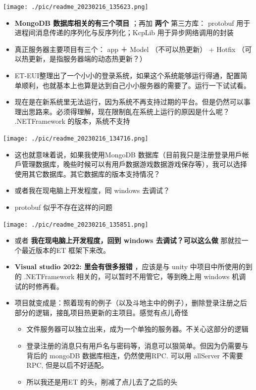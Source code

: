 \documentclass[9pt, b5paper]{article}
\begin{document}
\texttt{[image: ./pic/readme\_20230216\_135623.png]}
\begin{itemize}
\item \textbf{MongoDB 数据库相关的有三个项目} ；再加 \textbf{两个} 第三方库： protobuf 用于进程间消息传递的序列化与反序列化；KcpLib 用于异步网络调用的封装
\item 真正服务器主要项目有三个： app ＋ Model （不可以热更新） + Hotfix （可以热更新，是指服务器端的动态热更新？）
\item ET-EUI整理出了一个小小的登录系统，如果这个系统能够运行得通，配置简单顺利，也就基本上也算是达到自己小小服务器的需要了。运行一下试试看。
\item 现在是在新系统里无法运行，因为系统不再支持过期的平台。但是仍然可以事理出思路来。必须得理解，现在限制臫在系统上运行的原因是什么呢？ .NETFramework 的版本，系统不支持
\end{itemize}

\texttt{[image: ./pic/readme\_20230216\_134716.png]}
\begin{itemize}
\item 这也就意味着说，如果我使用MongoDB 数据库（目前我只是注册登录用戶帐戶管理数据库，晚些时候可以有用戶数据游戏数据游戏保存等），我可以选择使用其它数据库。其它数据库的版本支持情况？
\item 或者我在现电脑上开发程度，囘 windows 去调试？
\item protobuf 似乎不存在这样的问题
\end{itemize}

\texttt{[image: ./pic/readme\_20230216\_135851.png]}
\begin{itemize}
\item 或者 \textbf{我在现电脑上开发程度，回到 windows 去调试？可以这么做} 那就拉一个最近版本的ET 框架下来改。
\item \textbf{Visual studio 2022: 里会有很多报错} ，应该是与 unity 中项目中所使用的到的 .NETFramework 相关的，可以暂时不用管它，等到晚上用 windows 机调试的时修再看。
\item 项目就变成是：照着现有的例子（以及斗地主中的例子），删除登录注册之后部分的逻辑，接臫项目热更新的主项目。感觉有点儿奇怪
\begin{itemize}
\item 文件服务器可以独立出来，成为一个单独的服务器。不关心这部分的逻辑
\item 登录注册的消息只有用戶名与密码等，消息可以狠简单。但因为仍需要与背后的 mongoDB 数据库相连，仍然使用RPC. 可以用 allServer 不需要 RPC, 但是以后不好适配。
\item 所以我还是用ET 的头，削减了点儿去了之后的头
\end{itemize}
\end{itemize}
\end{document}
